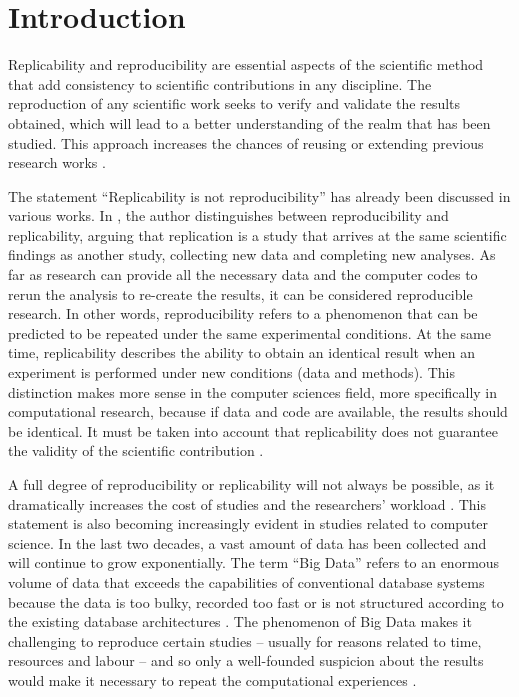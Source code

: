 \documentclass[ijgi,article,submit,moreauthors,pdftex]{Definitions/mdpi}
\begin{document}
\section{Introduction}
\label{sec:introduction}

Replicability and reproducibility are essential aspects of the scientific method that add consistency to scientific contributions in any discipline. The reproduction of any scientific work seeks to verify and validate the results obtained, which will lead to a better understanding of the realm that has been studied. This approach increases the chances of reusing or extending previous research works \citep{Meng2015a}.

The statement ``Replicability is not reproducibility'' has already been discussed in various works. In \cite{barba2018terminologies}, the author distinguishes between reproducibility and replicability, arguing that replication is a study that arrives at the same scientific findings as another study, collecting new data and completing new analyses. As far as research can provide all the necessary data and the computer codes to rerun the analysis to re-create the results, it can be considered reproducible research. In other words, reproducibility refers to a phenomenon that can be predicted to be repeated under the same experimental conditions. At the same time, replicability describes the ability to obtain an identical result when an experiment is performed under new conditions (data and methods). This distinction makes more sense in the computer sciences field, more specifically in computational research, because if data and code are available, the results should be identical. It must be taken into account that replicability does not guarantee the validity of the scientific contribution \citep{peng2011reproducible}.

A full degree of reproducibility or replicability will not always be possible, as it dramatically increases the cost of studies and the researchers' workload \citep{stodden2012reproducible}. This statement is also becoming increasingly evident in studies related to computer science. In the last two decades, a vast amount of data has been collected and will continue to grow exponentially. The term ``Big Data'' refers to an enormous volume of data that exceeds the capabilities of conventional database systems because the data is too bulky, recorded too fast or is not structured according to the existing database architectures \citep{Brunsdon2014a}. The phenomenon of Big Data makes it challenging to reproduce certain studies -- usually for reasons related to time, resources and labour -- and so only a well-founded suspicion about the results would make it necessary to repeat the computational experiences \citep{Gil2016a}.
\end{document}
